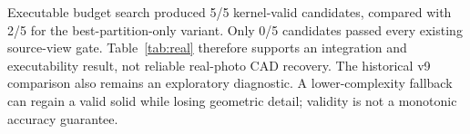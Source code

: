 Executable budget search produced 5/5 kernel-valid candidates, compared with 2/5 for the best-partition-only variant. Only 0/5 candidates passed every existing source-view gate. Table~\ref{tab:real} therefore supports an integration and executability result, not reliable real-photo CAD recovery. The historical v9 comparison also remains an exploratory diagnostic. A lower-complexity fallback can regain a valid solid while losing geometric detail; validity is not a monotonic accuracy guarantee.
